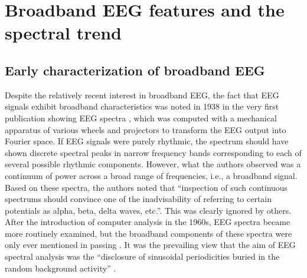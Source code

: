 \section{Broadband EEG features and the spectral trend} \label{sec:phenomenon}
\subsection{Early characterization of broadband EEG}
Despite the relatively recent interest in broadband EEG, the fact that EEG signals exhibit broadband characteristics was noted in 1938 in the very first publication showing EEG spectra \cite{Grass1938}, which was computed with a mechanical apparatus of various wheels and projectors to transform the EEG output into Fourier space. If EEG signals were purely rhythmic, the spectrum should have shown discrete spectral peaks in narrow frequency bands corresponding to each of several possible rhythmic components. However, what the authors observed was a continuum of power across a broad range of frequencies, i.e., a broadband signal. Based on these spectra, the authors noted that ``inspection of such continuous spectrums should convince one of the inadvisability of referring to certain potentials as alpha, beta, delta waves, etc.''\cite{Grass1938}. This was clearly ignored by others. After the introduction of computer analysis in the 1960s, EEG spectra became more routinely examined, but the broadband components of these spectra were only ever mentioned in passing \cite{Boudreau1963}. It was the prevailing view that the aim of EEG spectral analysis was the ``disclosure of sinusoidal periodicities buried in the random background activity'' \cite{Freeman1975}. 

